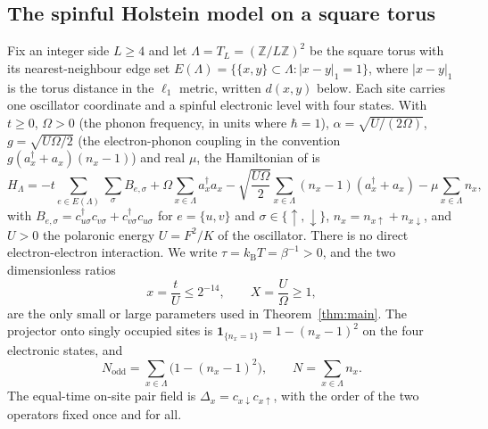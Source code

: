 \documentclass[11pt]{article}
\theoremstyle{plain}
\theoremstyle{definition}
\newcommand{\Nodd}{N_{\mathrm{odd}}}
\newcommand{\Dop}{\Delta}
\begin{document}
\subsection{The spinful Holstein model on a square torus}\label{sec:conv}

Fix an integer side $L\ge4$ and let $\Lambda=T_L=(\mathbb{Z}/L\mathbb{Z})^{2}$
be the square torus with its nearest-neighbour edge set
$E(\Lambda)=\{\{x,y\}\subset\Lambda:|x-y|_{1}=1\}$, where
$|x-y|_{1}$ is the torus distance in the $\ell_{1}$ metric, written $d(x,y)$
below. Each site carries one oscillator coordinate and a spinful electronic
level with four states. With $t\ge0$, $\Omega>0$ (the phonon frequency, in units
where $\hbar=1$), $\alpha=\sqrt{U/(2\Omega)}$, $g=\sqrt{U\Omega/2}$ (the
electron-phonon coupling in the convention $g(a^\dagger_x+a_x)(n_x-1)$) and real
$\mu$, the Hamiltonian of \cite{holstein1959} is
\begin{equation}\label{eq:H}
H_\Lambda=-t\sum_{e\in E(\Lambda)}\sum_{\sigma}B_{e,\sigma}
+\Omega\sum_{x\in\Lambda}a_x^\dagger a_x
-\sqrt{\frac{U\Omega}{2}}\sum_{x\in\Lambda}(n_x-1)(a_x^\dagger+a_x)
-\mu\sum_{x\in\Lambda}n_x ,
\end{equation}
with $B_{e,\sigma}=c^\dagger_{u\sigma}c_{v\sigma}+c^\dagger_{v\sigma}c_{u\sigma}$
for $e=\{u,v\}$ and $\sigma\in\{\uparrow,\downarrow\}$,
$n_x=n_{x\uparrow}+n_{x\downarrow}$, and $U>0$ the polaronic energy
$U=F^{2}/K$ of the oscillator. There is no direct electron-electron interaction.
We write $\tau=k_{\mathrm{B}}T=\beta^{-1}>0$, and the two dimensionless ratios
\begin{equation}\label{eq:ratios}
x=\frac{t}{U}\le2^{-14},\qquad X=\frac{U}{\Omega}\ge1,
\end{equation}
are the only small or large parameters used in Theorem~\ref{thm:main}.
The projector onto singly occupied sites is
$\mathbf{1}_{\{n_x=1\}}=1-(n_x-1)^{2}$ on the four electronic states, and
\begin{equation}\label{eq:Nodd}
\Nodd=\sum_{x\in\Lambda}\bigl(1-(n_x-1)^{2}\bigr),\qquad
N=\sum_{x\in\Lambda}n_x .
\end{equation}
The equal-time on-site pair field is $\Dop_x=c_{x\downarrow}c_{x\uparrow}$, with
the order of the two operators fixed once and for all.
\end{document}
